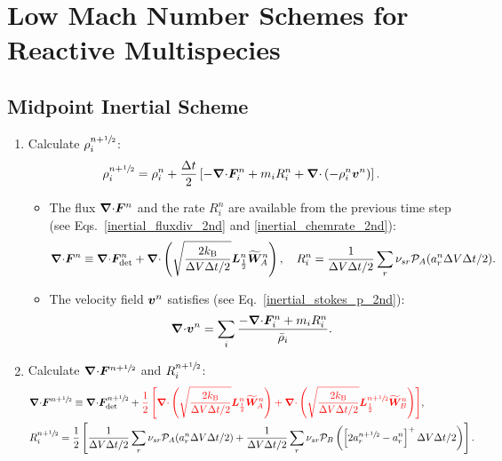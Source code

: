 \documentclass[
10pt
showpacs, showkeys,
amsmath,amssymb,
aps,
pre,
floatfix,
]{revtex4-1}
\newcommand{\divg}{{\V\nabla\cdot}}                       %
\begin{document}
\section*{Low Mach Number Schemes for Reactive Multispecies}



\subsection{Midpoint Inertial Scheme}

\begin{enumerate}

\item Calculate $\rho^{n+\sfrac{1}{2}}_i$:
\begin{equation}
\rho^{n+\myhalf}_i = \rho^n_i + \frac{\D{t}}{2} \left[ -\divg\V{F}^n_i + m_i R^n_i + \divg\left( -\rho^n_i \V{v}^n \right) \right].
\end{equation}
\begin{itemize}
\item The flux $\divg\V{F}^n$ and the rate $R^n_i$ are available from the previous time step (see Eqs.~\eqref{inertial_fluxdiv_2nd} and \eqref{inertial_chemrate_2nd}):
\begin{equation}
\divg\V{F}^n \equiv \divg\V{F}^n_\mathrm{det} + \divg\left( \sqrt{ \frac{2k_\mathrm{B}}{\D{V}\D{t}/2} } \V{L}^n_{\frac12} \widetilde{\V{W}}^n_A \right),
\quad R^n_i = \frac{1}{\D{V}\D{t}/2} \sum_r \nu_{sr} \mathcal{P}_A(a^n_r\D{V}\D{t}/2).
\end{equation}
\item The velocity field $\boldsymbol{v}^n$ satisfies (see Eq.~\eqref{inertial_stokes_p_2nd}):
\begin{equation}
\divg\V{v}^n = \sum_i \frac{ -\divg\V{F}^n_i + m_i R^n_i }{\bar{\rho}_i}.
\end{equation}
\end{itemize}

\item Calculate $\divg\V{F}^{n+\myhalf}$ and $R^{n+\sfrac{1}{2}}_i$:
\begin{align}
&\divg\V{F}^{n+\myhalf} \equiv \divg\V{F}_\mathrm{det}^{n+\myhalf} + 
{\color{red}
\frac{1}{2}\left[ 
\divg\left( \sqrt{ \frac{2k_\mathrm{B}}{\D{V}\D{t}/2} } \V{L}^n_{\frac12} \widetilde{\V{W}}^n_A \right) 
+\divg\left( \sqrt{ \frac{2k_\mathrm{B}}{\D{V}\D{t}/2} } \V{L}^{n+\myhalf}_{\frac12} \widetilde{\V{W}}^n_B \right) 
\right]}, \\
&R^{n+\myhalf}_i = \frac{1}{2}\left[ \frac{1}{\D{V}\D{t}/2} \sum_r \nu_{sr} \mathcal{P}_A(a^n_r\D{V}\D{t}/2) + \frac{1}{\D{V}\D{t}/2} \sum_r \nu_{sr} \mathcal{P}_B\left( \left[ 2 a^{n+\myhalf}_r - a^n_r \right]^+ \D{V}\D{t}/2 \right) \right].
\end{align}


\end{enumerate}
\end{document}
